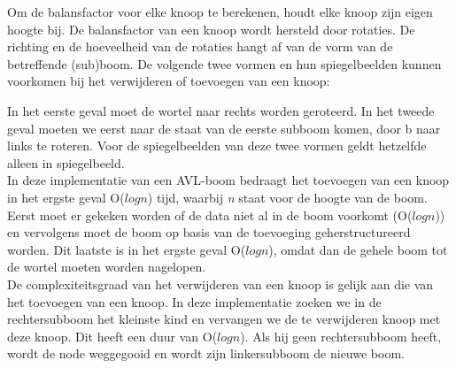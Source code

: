 \documentclass[a4paper,10pt]{article}
\begin{document}
Om de balansfactor voor elke knoop te berekenen, houdt elke knoop zijn eigen hoogte bij. De balansfactor van een knoop wordt hersteld door rotaties. De richting en de hoeveelheid van de rotaties hangt af van de vorm van de betreffende (sub)boom. De volgende twee vormen en hun spiegelbeelden kunnen voorkomen bij het verwijderen of toevoegen van een knoop: \\

\begin{center}
\end{center}

In het eerste geval moet de wortel naar rechts worden geroteerd. In het tweede geval moeten we eerst naar de staat van de eerste subboom komen, door b naar links te roteren. Voor de spiegelbeelden van deze twee vormen geldt hetzelfde alleen in spiegelbeeld. \\

In deze implementatie van een AVL-boom bedraagt het toevoegen van een knoop in het ergste geval O($logn$) tijd, waarbij \emph{n} staat voor de hoogte van de boom. Eerst moet er gekeken worden of de data niet al in de boom voorkomt (O($logn$)) en vervolgens moet de boom op basis van de toevoeging geherstructureerd worden. Dit laatste is in het ergste geval O($logn$), omdat dan de gehele boom tot de wortel moeten worden nagelopen. \\

De complexiteitsgraad van het verwijderen van een knoop is gelijk aan die van het toevoegen van een knoop. In deze implementatie zoeken we in de rechtersubboom het kleinste kind en vervangen we de te verwijderen knoop met deze knoop. Dit heeft een duur van O($logn$). Als hij geen rechtersubboom heeft, wordt de node weggegooid en wordt zijn linkersubboom de nieuwe boom.
\end{document}
